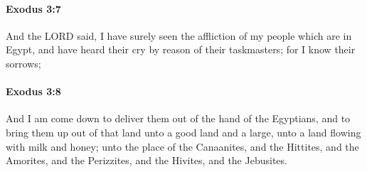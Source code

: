 		\paragraph{Exodus 3:7} %
			\label{EXODUS-3-7}

			And the LORD said, I have surely seen the affliction of my people which are in Egypt, and have heard their cry by reason of their taskmasters; for I know their sorrows;


		\paragraph{Exodus 3:8} %
			\label{EXODUS-3-8}

			And I am come down to deliver them out of the hand of the Egyptians, and to bring them up out of that land unto a good land and a large, unto a land flowing with milk and honey; unto the place of the Canaanites, and the Hittites, and the Amorites, and the Perizzites, and the Hivites, and the Jebusites.

